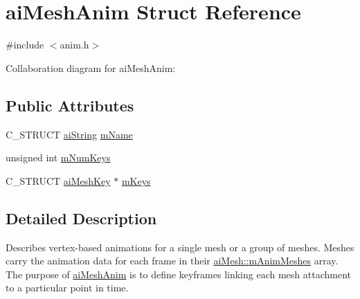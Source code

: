 \hypertarget{structai_mesh_anim}{\section{ai\-Mesh\-Anim Struct Reference}
\label{structai_mesh_anim}
}


{\ttfamily \#include $<$anim.\-h$>$}



Collaboration diagram for ai\-Mesh\-Anim\-:
\subsection*{Public Attributes}
\begin{DoxyCompactItemize}
\item 
C\-\_\-\-S\-T\-R\-U\-C\-T \hyperlink{structai_string}{ai\-String} \hyperlink{structai_mesh_anim_a20751a739377fdba514c676ef4bda4c7}{m\-Name}
\item 
unsigned int \hyperlink{structai_mesh_anim_aa8702d42bf619ccc8414a556f41634d8}{m\-Num\-Keys}
\item 
C\-\_\-\-S\-T\-R\-U\-C\-T \hyperlink{structai_mesh_key}{ai\-Mesh\-Key} $\ast$ \hyperlink{structai_mesh_anim_abc78e9f6d7583c541447e8c389488f1b}{m\-Keys}
\end{DoxyCompactItemize}


\subsection{Detailed Description}
Describes vertex-\/based animations for a single mesh or a group of meshes. Meshes carry the animation data for each frame in their \hyperlink{structai_mesh_a5078f7db7e99ed05db89dfa412f0e990}{ai\-Mesh\-::m\-Anim\-Meshes} array. The purpose of \hyperlink{structai_mesh_anim}{ai\-Mesh\-Anim} is to define keyframes linking each mesh attachment to a particular point in time. 

